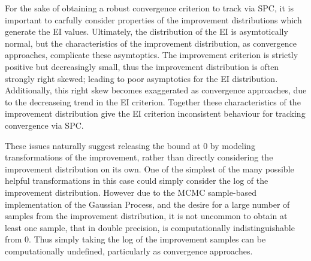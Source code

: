 \documentclass[12pt]{article}
\begin{document}
%
For the sake of obtaining a robust convergence criterion to track via SPC, it is important to carfully consider properties of the improvement distributions which generate the EI values.
%
Ultimately, the distribution of the EI is asymtotically normal, but the characteristics of the improvement distribution, as convergence approaches, complicate these asymtoptics. 
%
%
The improvement criterion is strictly positive but decreasingly small, thus the improvement distribution is often strongly right skewed; leading to poor asymptotics for the EI distribution.
%
Additionally, this right skew becomes exaggerated as convergence approaches, due to the decreaseing trend in the EI criterion.
Together these characteristics of the improvement distribution give the EI criterion inconsistent behaviour for tracking convergence via SPC. 
%
 
%
%

These issues naturally suggest releasing the bound at 0 by modeling transformations of the improvement, rather than directly considering the improvement distribution on its own.
%
One of the simplest of the many possible helpful transformations in this case could simply consider the log of the improvement distribution. 
%
However due to the MCMC sample-based implementation of the Gaussian Process, and the desire for a large number of samples from the improvement distribution, it is not uncommon to obtain at least one sample, that in double precision, is computationally indistinguishable from 0.
%
Thus simply taking the log of the improvement samples can be computationally undefined, particularly as convergence approaches.
\end{document}
